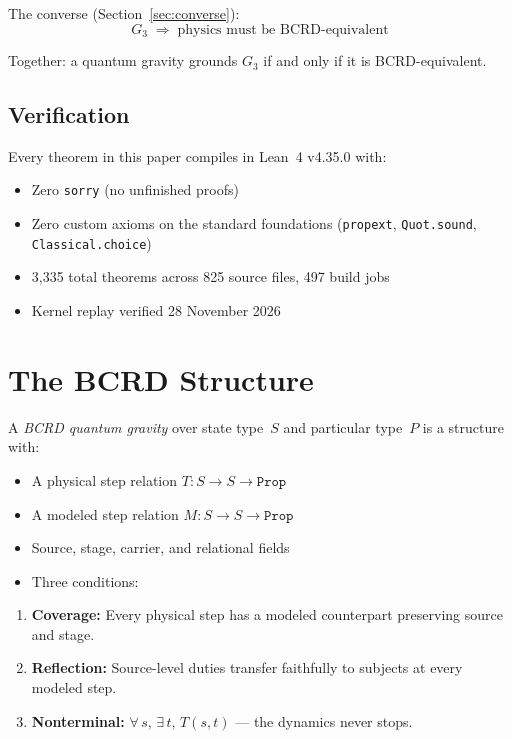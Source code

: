 The converse (Section~\ref{sec:converse}):
\begin{equation}\label{eq:converse}
G_3 \;\Longrightarrow\; \text{physics must be BCRD-equivalent}
\end{equation}

Together: a quantum gravity grounds $G_3$ if and only if it is BCRD-equivalent.

\subsection{Verification}

Every theorem in this paper compiles in Lean~4 v4.35.0 with:
\begin{itemize}
\item Zero \texttt{sorry} (no unfinished proofs)
\item Zero custom axioms on the standard foundations (\texttt{propext}, \texttt{Quot.sound}, \texttt{Classical.choice})
\item 3{,}335 total theorems across 825 source files, 497 build jobs
\item Kernel replay verified 28 November 2026
\end{itemize}

\section{The BCRD Structure}\label{sec:bcrd}

\begin{definition}[BCRDIsQG]\label{def:bcrd}
A \emph{BCRD quantum gravity} over state type~$S$ and particular type~$P$ is a structure with:
\begin{itemize}
\item A physical step relation $T : S \to S \to \texttt{Prop}$
\item A modeled step relation $M : S \to S \to \texttt{Prop}$
\item Source, stage, carrier, and relational fields
\item Three conditions:
\end{itemize}
\begin{enumerate}
\item \textbf{Coverage:} Every physical step has a modeled counterpart preserving source and stage.
\item \textbf{Reflection:} Source-level duties transfer faithfully to subjects at every modeled step.
\item \textbf{Nonterminal:} $\forall\, s,\, \exists\, t,\, T(s, t)$ --- the dynamics never stops.
\end{enumerate}
\end{definition}


